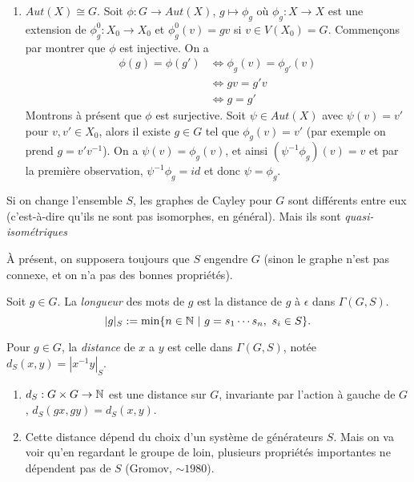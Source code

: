 \begin{preuve}
\begin{enumerate}
    \item $Aut(X) \cong G$. Soit $\phi: G \to Aut(X)$, $g \mapsto \phi_g$ où $\phi_g : X \to X$ est une
      extension de $\phi_g^0: X_0 \to X_0$ et $\phi_g^0(v) = gv$ si $v \in V(X_0) = G$. Commençons par montrer
      que $\phi$ est injective. On a
      \begin{align*}
        \phi(g) = \phi(g') &\iff \phi_g(v) = \phi_{g'}(v)\\
        &\iff gv = g'v\\
        &\iff g = g'
      \end{align*}
      Montrons à présent que $\phi$ est surjective. Soit $\psi \in Aut(X)$ avec $\psi(v) = v'$ pour $v,v' \in
      X_0$, alors il existe $g \in G$ tel que $\phi_g(v) = v'$ (par exemple on prend $g = v'v^{-1}$). On a
      $\psi(v) = \phi_g(v)$, et ainsi $(\psi^{-1}\phi_g)(v) = v$ et par la première observation,
      $\psi^{-1}\phi_g = id$ et donc $\psi = \phi_g$. \qedhere
    \end{enumerate}
  \end{preuve}

  \begin{rem}
    Si on change l'ensemble $S$, les graphes de Cayley pour $G$ sont différents entre eux (c'est-à-dire qu'ils
    ne sont pas isomorphes, en général). Mais ils sont \emph{quasi-isométriques} 
  \end{rem}


  À présent, on supposera toujours que $S$ engendre $G$ (sinon le graphe n'est pas connexe, et on n'a pas des
  bonnes propriétés).

  \begin{defi} 
    Soit $g \in G$. La \emph{longueur} des mots de $g$ est la distance de $g$ à $\epsilon$ dans $\Gamma(G,S)$.
      \[|g|_S := \min\{n \in \mathbb{N}\ |\ g = s_1\cdots s_n,\ s_i \in S\}.\]

    Pour $g \in G$, la \emph{distance} de $x$ a $y$  est celle dans
    $\Gamma(G,S)$, notée $d_S(x,y) = |x^{-1}y|_S$.
  \end{defi}

  \begin{obss}
    \begin{enumerate}
    \item $d_S: G \times G \to \mathbb{N}$ est une distance sur $G$, invariante par l'action à gauche de $G$, $d_S(gx,
      gy) = d_S(x,y)$.

    \item Cette distance dépend du choix d'un système de générateurs $S$. Mais on va voir qu'en regardant le
      groupe \og de loin\fg, plusieurs propriétés importantes ne dépendent pas de $S$ (Gromov, $\sim 1980$).
    \end{enumerate}
  \end{obss}

